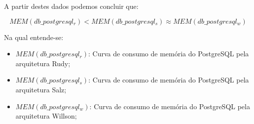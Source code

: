 A partir destes dados podemos concluir que:

$$
    MEM(db\_postgresql_{r}) < MEM(db\_postgresql_{s}) \approx MEM(db\_postgresql_{w})
$$

Na qual entende-se:

\begin{itemize}
\item $MEM(db\_postgresql_{r})$: Curva de consumo de memória do PostgreSQL pela arquitetura Rudy;
\item $MEM(db\_postgresql_{s})$: Curva de consumo de memória do PostgreSQL pela arquitetura Salz;
\item $MEM(db\_postgresql_{w})$: Curva de consumo de memória do PostgreSQL pela arquitetura Willson;
\end{itemize}
